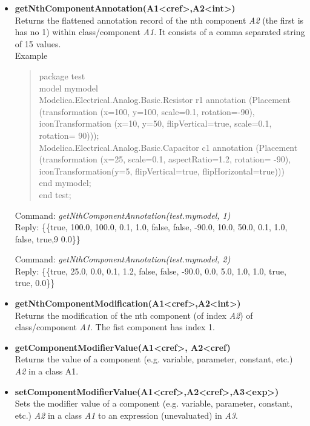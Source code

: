\documentclass[11pt,a4paper,oneside,english]{book}
\newenvironment{modelicaExamples}{\begin{itemize}}{\end{itemize}}
\newcommand{\api}[2]{\item \textbf{#1} \\ #2}
\newcommand{\tab}{\hspace{2em}}
\newcommand{\command}[1]{Command: \textit{#1}\\}
\newcommand{\reply}[1]{Reply: #1}
\newcommand{\functionex}[2]{\begin{singlespace} \command{#1} \reply{#2} \end{singlespace}}
\newcommand{\examples}{Example}
\newenvironment{mocode}{\begin{verse}\begin{singlespace}\begin{scriptsize}\ttfamily}{\end{scriptsize}\end{singlespace}\end{verse}}
\begin{document}
\begin{modelicaExamples}
		\api{getNthComponentAnnotation(A1<cref>,A2<int>)}{Returns the flattened annotation record of the nth component \textit{A2} (the first is has no 1) within class/component \textit{A1}. It consists of a comma separated string of 15 values.\\
		\examples
		\begin{mocode}
		package test\\
		\tab model mymodel\\
		\tab\tab Modelica.Electrical.Analog.Basic.Resistor r1 annotation (Pla\-ce\-ment (tran\-sfor\-ma\-tion (x=100, y=100, scale=0.1, rotation=-90), i\-con\-Tran\-sfor\-ma\-tion (x=10, y=50, flipVertical=true, scale=0.1, ro\-ta\-tion= 90)));\\
		\tab\tab Modelica.Electrical.Analog.Basic.Capacitor c1 annotation (Pla\-ce\-ment (transformation (x=25,  scale=0.1, aspectRatio=1.2, ro\-ta\-tion= -90), iconTransformation(y=5, flipVertical=true, flipHorizontal=true)))\\
		\tab end mymodel;\\
		end test;
		\end{mocode}
		\functionex{getNthComponentAnnotation(test.mymodel, 1)}
		{\{\{true, 100.0, 100.0, 0.1, 1.0, false, false, -90.0, 10.0, 50.0, 0.1, 1.0, false, true,9 0.0\}\}}
		
		\functionex{getNthComponentAnnotation(test.mymodel, 2)}
		{\{\{true, 25.0, 0.0, 0.1, 1.2, false, false, -90.0, 0.0, 5.0, 1.0, 1.0, true, true, 0.0\}\}}
		
		}
		
			\api{getNthComponentModification(A1<cref>,A2<int>)}{Returns the modification of the nth component (of index \textit{A2}) of class/component \textit{A1}. The fist component has index 1.}
			
			\api{getComponentModifierValue(A1<cref>, A2<cref)}{Returns the value of a component (e.g. variable, parameter, constant, etc.) \textit{A2} in a class \textup{A1}.}
			
			\api{setComponentModifierValue(A1<cref>,A2<cref>,A3<exp>)}{Sets the modifier value of a component (e.g. variable, parameter, constant, etc.) \textit{A2} in a class \textit{A1} to an expression (unevaluated) in \textit{A3}.}
			

\end{modelicaExamples}
\end{document}
